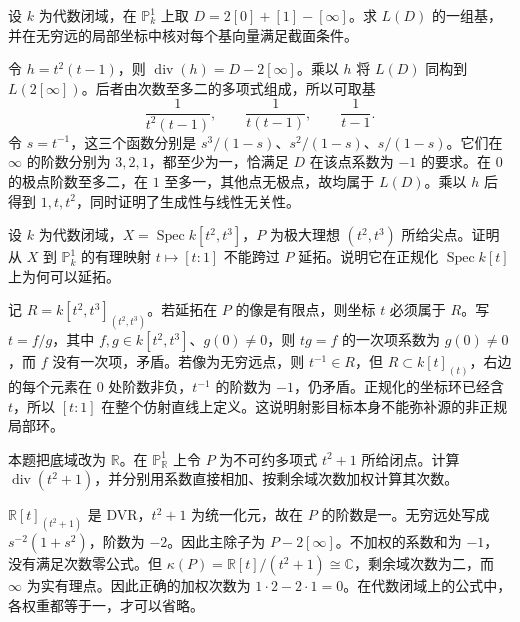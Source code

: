 \begin{exercise}\label{b3:ex:H-prescribed-poles}
	设 \(k\) 为代数闭域，在 \(\mathbb P_k^1\) 上取 \(D=2[0]+[1]-[\infty]\)。求 \(L(D)\) 的一组基，并在无穷远的局部坐标中核对每个基向量满足截面条件。
\end{exercise}
\begin{solution}
	令 \(h=t^2(t-1)\)，则 \(\operatorname{div}(h)=D-2[\infty]\)。乘以 \(h\) 将 \(L(D)\) 同构到 \(L(2[\infty])\)。后者由次数至多二的多项式组成，所以可取基
	\[
		\frac1{t^2(t-1)},\qquad \frac1{t(t-1)},\qquad \frac1{t-1}.
	\]
	令 \(s=t^{-1}\)，这三个函数分别是 \(s^3/(1-s)\)、\(s^2/(1-s)\)、\(s/(1-s)\)。它们在 \(\infty\) 的阶数分别为 \(3,2,1\)，都至少为一，恰满足 \(D\) 在该点系数为 \(-1\) 的要求。在 \(0\) 的极点阶数至多二，在 \(1\) 至多一，其他点无极点，故均属于 \(L(D)\)。乘以 \(h\) 后得到 \(1,t,t^2\)，同时证明了生成性与线性无关性。
\end{solution}

\begin{exercise}\label{b3:ex:H-cusp-rational-map}
	设 \(k\) 为代数闭域，\(X=\operatorname{Spec}k[t^2,t^3]\)，\(P\) 为极大理想 \((t^2,t^3)\) 所给尖点。证明从 \(X\) 到 \(\mathbb P_k^1\) 的有理映射 \(t\mapsto[t:1]\) 不能跨过 \(P\) 延拓。说明它在正规化 \(\operatorname{Spec}k[t]\) 上为何可以延拓。
\end{exercise}
\begin{solution}
	记 \(R=k[t^2,t^3]_{(t^2,t^3)}\)。若延拓在 \(P\) 的像是有限点，则坐标 \(t\) 必须属于 \(R\)。写 \(t=f/g\)，其中 \(f,g\in k[t^2,t^3]\)、\(g(0)\ne0\)，则 \(tg=f\) 的一次项系数为 \(g(0)\ne0\)，而 \(f\) 没有一次项，矛盾。若像为无穷远点，则 \(t^{-1}\in R\)，但 \(R\subset k[t]_{(t)}\)，右边的每个元素在 \(0\) 处阶数非负，\(t^{-1}\) 的阶数为 \(-1\)，仍矛盾。正规化的坐标环已经含 \(t\)，所以 \([t:1]\) 在整个仿射直线上定义。这说明射影目标本身不能弥补源的非正规局部环。
\end{solution}

\begin{exercise}\label{b3:ex:H-residue-degree-weight}
	本题把底域改为 \(\mathbb R\)。在 \(\mathbb P_{\mathbb R}^1\) 上令 \(P\) 为不可约多项式 \(t^2+1\) 所给闭点。计算 \(\operatorname{div}(t^2+1)\)，并分别用系数直接相加、按剩余域次数加权计算其次数。
\end{exercise}
\begin{solution}
	\(\mathbb R[t]_{(t^2+1)}\) 是 DVR，\(t^2+1\) 为统一化元，故在 \(P\) 的阶数是一。无穷远处写成 \(s^{-2}(1+s^2)\)，阶数为 \(-2\)。因此主除子为 \(P-2[\infty]\)。不加权的系数和为 \(-1\)，没有满足次数零公式。但 \(\kappa(P)=\mathbb R[t]/(t^2+1)\cong\mathbb C\)，剩余域次数为二，而 \(\infty\) 为实有理点。因此正确的加权次数为 \(1\cdot2-2\cdot1=0\)。在代数闭域上的公式中，各权重都等于一，才可以省略。
\end{solution}

